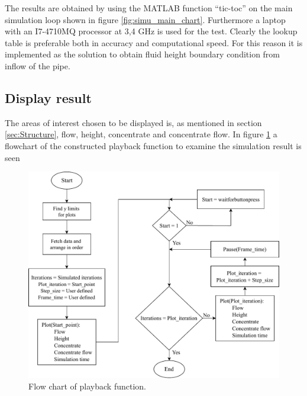 The results are obtained by using the MATLAB function ``tic-toc'' on the main simulation loop shown in figure \ref{fig:simu_main_chart}. Furthermore a laptop with an I7-4710MQ processor at 3,4 GHz is used for the test. Clearly the lookup table is preferable both in accuracy and computational speed. For this reason it is implemented as the solution to obtain fluid height boundary condition from inflow of the pipe.

\subsection*{Display result}

The areas of interest chosen to be displayed is, as mentioned in section \ref{sec:Structure}, flow, height, concentrate and concentrate flow.
In figure \ref{fig:data_plot_chart} a flowchart of the constructed playback function to examine the simulation result is seen 

\begin{figure}[H]
\centering
\includegraphics[width=0.9 \textwidth]{report/simulation/pictures/data_plot_chart.pdf}
\caption{Flow chart of playback function.}
\label{fig:data_plot_chart}
\end{figure}

